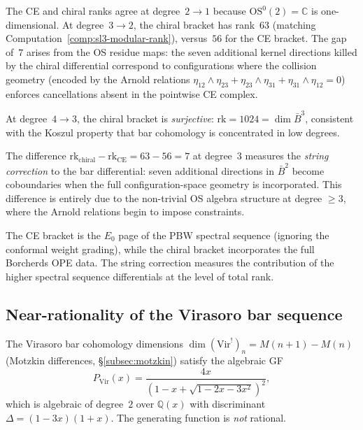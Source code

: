 The CE and chiral ranks agree at degree~$2 \to 1$ because
$\mathrm{OS}^0(2) = \mathbb{C}$ is one-dimensional. At degree~$3 \to 2$,
the chiral bracket has rank~$63$ (matching
Computation~\ref{comp:sl3-modular-rank}), versus~$56$ for the
CE bracket. The gap of~$7$ arises from the OS residue maps: the
seven additional kernel directions killed by the chiral
differential correspond to configurations where the collision
geometry (encoded by the Arnold relations
$\eta_{12} \wedge \eta_{23} + \eta_{23} \wedge \eta_{31} +
\eta_{31} \wedge \eta_{12} = 0$) enforces cancellations absent
in the pointwise CE complex.

At degree~$4 \to 3$, the chiral bracket is \emph{surjective}:
$\mathrm{rk} = 1024 = \dim \bar{B}^3$, consistent with the
Koszul property that bar cohomology is concentrated in low degrees.

\begin{remark}
\label{rem:ce-vs-chiral}
The difference $\mathrm{rk}_{\mathrm{chiral}} - \mathrm{rk}_{\mathrm{CE}}
= 63 - 56 = 7$ at degree~$3$ measures the \emph{string correction}
to the bar differential: seven additional directions in
$\bar{B}^2$ become coboundaries when the full configuration-space
geometry is incorporated. This difference is entirely due to the
non-trivial OS algebra structure at degree $\geq 3$, where the
Arnold relations begin to impose constraints.

The CE bracket is the $E_0$ page of the PBW spectral
sequence (ignoring the conformal weight grading), while the
chiral bracket incorporates the full Borcherds OPE data. The
string correction measures the contribution of the higher spectral
sequence differentials at the level of total rank.
\end{remark}

\subsection{Near-rationality of the Virasoro bar sequence}
\label{subsec:virasoro-near-rationality}

The Virasoro bar cohomology dimensions $\dim(\mathrm{Vir}^!)_n = M(n+1) - M(n)$
(Motzkin differences, \S\ref{subsec:motzkin}) satisfy the algebraic GF
\begin{equation}\label{eq:virasoro-gf-algebraic}
P_{\mathrm{Vir}}(x) = \frac{4x}{(1 - x + \sqrt{1-2x-3x^2})^2},
\end{equation}
which is algebraic of degree~$2$ over $\mathbb{Q}(x)$ with discriminant
$\Delta = (1-3x)(1+x)$. The generating function is \emph{not} rational.

